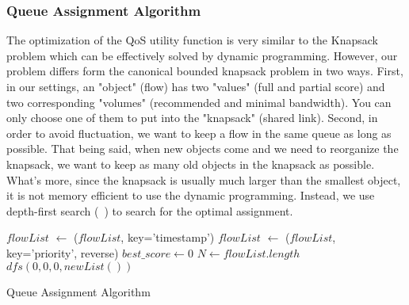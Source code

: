 \subsubsection{Queue Assignment Algorithm}
\label{sect:queueAssignAlgo}

The optimization of the QoS utility function is very similar to the Knapsack problem  which can be effectively solved by dynamic
programming. However, our problem differs form the canonical bounded knapsack problem in two ways. First, in our settings, an "object" (flow) has
two "values" (full and partial score) and two corresponding "volumes" (recommended and minimal bandwidth). You can only choose one of them to put
into the "knapsack" (shared link). Second, in order to avoid fluctuation, we want to keep a flow in the same queue as long as possible. That being
said, when new objects come and we need to reorganize the knapsack, we want to keep as many old objects in the knapsack as possible. What's more,
since the knapsack is usually much larger than the smallest object, it is not memory efficient to use the dynamic programming. Instead, we use
depth-first search (~) to search for the optimal assignment.

\begin{algorithm}[htp]
  \SetAlgoLined
  \scriptsize
  
  $flowList$ $\leftarrow$ \Sort($flowList$, key='timestamp')\;
  $flowList$ $\leftarrow$ \Sort($flowList$, key='priority', reverse)\;
  $best\_score \leftarrow 0$ \;
  $N \leftarrow flowList.length$ \;
  $dfs(0, 0, 0, newList())$ \;
  \setcounter{AlgoLine}{0}
  \caption{Queue Assignment Algorithm}
  \label{alg:queueAssignAlgo}
\end{algorithm} 


